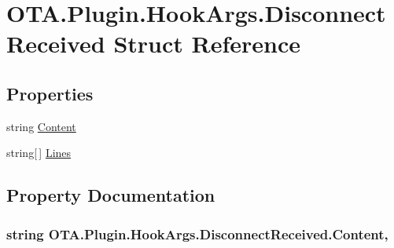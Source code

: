 \hypertarget{struct_o_t_a_1_1_plugin_1_1_hook_args_1_1_disconnect_received}{}\section{O\+T\+A.\+Plugin.\+Hook\+Args.\+Disconnect\+Received Struct Reference}
\label{struct_o_t_a_1_1_plugin_1_1_hook_args_1_1_disconnect_received}
\subsection*{Properties}
\begin{DoxyCompactItemize}
\item 
string \hyperlink{struct_o_t_a_1_1_plugin_1_1_hook_args_1_1_disconnect_received_ac322ff89c952387d31a733de92bf6762}{Content}
\item 
string\mbox{[}$\,$\mbox{]} \hyperlink{struct_o_t_a_1_1_plugin_1_1_hook_args_1_1_disconnect_received_ae4c80f6844358b2cf6d2a5562c3ebd55}{Lines}
\end{DoxyCompactItemize}


\subsection{Property Documentation}
\hypertarget{struct_o_t_a_1_1_plugin_1_1_hook_args_1_1_disconnect_received_ac322ff89c952387d31a733de92bf6762}{}
\subsubsection[{Content}]{\setlength{\rightskip}{0pt plus 5cm}string O\+T\+A.\+Plugin.\+Hook\+Args.\+Disconnect\+Received.\+Content\hspace{0.3cm}{\ttfamily [get]}, {\ttfamily [set]}}\label{struct_o_t_a_1_1_plugin_1_1_hook_args_1_1_disconnect_received_ac322ff89c952387d31a733de92bf6762}
\hypertarget{struct_o_t_a_1_1_plugin_1_1_hook_args_1_1_disconnect_received_ae4c80f6844358b2cf6d2a5562c3ebd55}{}
